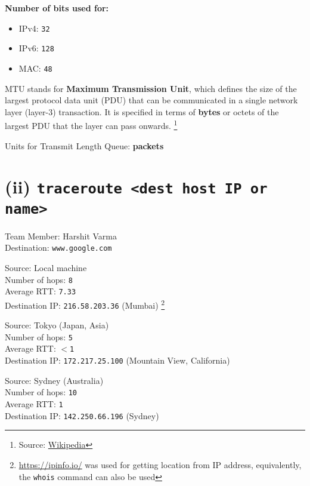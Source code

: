 \documentclass[11pt, fleqn]{article}
\begin{document}
\textbf{Number of bits used for:}
\begin{itemize}[itemsep=-1ex]
    \item IPv4: \texttt{32}
    \item IPv6: \texttt{128}
    \item MAC: \texttt{48}
\end{itemize}

\hrulefill
\medskip 

MTU stands for \textbf{Maximum Transmission Unit}, which defines the size of the largest protocol data unit (PDU) that can be communicated in a single network layer (layer-3) transaction. It is specified in terms of \textbf{bytes} or octets of the largest PDU that the layer can pass onwards. \footnote{Source:  \href{https://en.wikipedia.org/wiki/Maximum_transmission_unit}{Wikipedia} }

\hrulefill
\medskip

Units for Transmit Length Queue: \textbf{packets}


\newpage
\section*{(ii) \texttt{traceroute <dest host IP or name>}}
\label{partb}
\setcounter{equation}{0}

Team Member: Harshit Varma\\
Destination: \texttt{www.google.com}

\hrulefill
\smallskip

Source: Local machine\\
Number of hops: \texttt{8}\\
Average RTT: \texttt{7.33}\\
Destination IP: \texttt{216.58.203.36} (Mumbai) \footnote{\url{https://ipinfo.io/} was used for getting location from IP address, equivalently, the \texttt{whois} command can also be used}

\hrulefill
\smallskip

Source: Tokyo (Japan, Asia)\\
Number of hops: \texttt{5}\\
Average RTT: $<$\texttt{1}\\
Destination IP: \texttt{172.217.25.100} (Mountain View, California)

\hrulefill
\smallskip

Source: Sydney (Australia)\\
Number of hops: \texttt{10}\\
Average RTT: \texttt{1}\\
Destination IP: \texttt{142.250.66.196} (Sydney)
\end{document}
